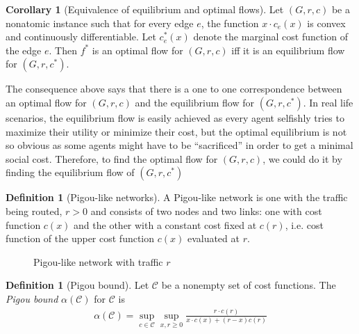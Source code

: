 \documentclass[a4paper,10pt]{article}
\theoremstyle{definition}
\newtheorem{cor}[thm]{Corollary}
\newtheorem{defn}[thm]{Definition}
\begin{document}
\begin{cor}[Equivalence of equilibrium and optimal flows]\label{cor:equiv}
Let $(G,r,c)$ be a nonatomic instance such that for every edge $e$, the function $x\cdot c_e(x)$ is convex and continuously differentiable. Let $c_e^\ast(x)$ denote the marginal cost function of the edge $e$. Then $f^\ast$ is an optimal flow for $(G,r,c)$ iff it is an equilibrium flow for $(G,r,c^\ast)$.
\end{cor}
The consequence above says that there is a one to one correspondence between an optimal flow for $(G,r,c)$ and the equilibrium flow for $(G,r,c^\ast)$. In real life scenarios, the equilibrium flow is easily achieved as every agent selfishly tries to maximize their utility or minimize their cost, but the optimal equilibrium is not so obvious as some agents might have to be ``sacrificed'' in order to get a minimal social cost. Therefore, to find the optimal flow for $(G,r,c)$, we could do it by finding the equilibrium flow of $(G,r,c^\ast)$



\begin{defn}[Pigou-like networks]
A Pigou-like network is one with the traffic being routed, $r>0$ and consists of two nodes and two links: one with cost function $c(x)$ and the other with a constant cost fixed at $c(r)$, i.e. cost function of the upper cost function $c(x)$ evaluated at $r$.
\end{defn}

\begin{figure}[h]
\centering
\def\layersep{2.5cm}
\caption{Pigou-like network with traffic $r$}\label{fig:pigoulike}
\end{figure}
\begin{defn}[Pigou bound]
Let $\mathcal{C}$ be a nonempty set of cost functions. The \emph{Pigou bound} $\alpha(\mathcal{C})$ for $\mathcal{C}$ is 
\begin{align*}
\alpha(\mathcal{C}) = \sup_{c \in \mathcal{C}} \sup_{x,r\geq 0} \frac{r \cdot c(r)}{x\cdot c(x)+(r-x)c(r)}
\end{align*}
\end{defn}
\end{document}
